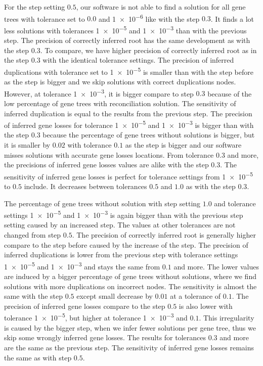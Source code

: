 For the step setting $0.5$, our software is not able to find a solution for all gene trees with tolerance set to $0.0$ and \num{1e-6} like with the step $0.3$. It finds a lot less solutions with tolerances \num{1e-5} and \num{1e-3} than with the previous step. The precision of correctly inferred root has the same development as with the step $0.3$. To compare, we have higher precision of correctly inferred root as in the step $0.3$ with the identical tolerance settings. The precision of inferred duplications with tolerance set to \num{1e-5} is smaller than with the step before as the step is bigger and we skip solutions with correct duplications nodes. However, at tolerance \num{1e-3}, it is bigger compare to step $0.3$ because of the low percentage of gene trees with reconciliation solution. The sensitivity of inferred duplication is equal to the results from the previous step. The precision of inferred gene losses for tolerance \num{1e-5} and \num{1e-3} is bigger than with the step $0.3$ because the percentage of gene trees without solutions is bigger, but it is smaller by $0.02$ with tolerance $0.1$ as the step is bigger and our software misses solutions with accurate gene losses locations. From tolerance $0.3$ and more, the precisions of inferred gene losses values are alike with the step $0.3$. The sensitivity of inferred gene losses is perfect for tolerance settings from \num{1e-5} to $0.5$ include. It decreases between tolerances $0.5$ and $1.0$ as with the step $0.3$.

The percentage of gene trees without solution with step setting $1.0$ and tolerance settings \num{1e-5} and \num{1e-3} is again bigger than with the previous step setting caused by an increased step. The values at other tolerances are not changed from step $0.5$. The precision of correctly inferred root is generally higher compare to the step before caused by the increase of the step. The precision of inferred duplications is lower from the previous step with tolerance settings \num{1e-5} and \num{1e-3} and stays the same from $0.1$ and more. The lower values are induced by a bigger percentage of gene trees without solutions, where we find solutions with more duplications on incorrect nodes. The sensitivity is almost the same with the step $0.5$ except small decrease by $0.01$ at a tolerance of $0.1$. The precision of inferred gene losses compare to the step $0.5$ is also lower with tolerance \num{1e-5}, but higher at tolerance \num{1e-3} and $0.1$. This irregularity is caused by the bigger step, when we infer fewer solutions per gene tree, thus we skip some wrongly inferred gene losses. The results for tolerances $0.3$ and more are the same as the previous step. The sensitivity of inferred gene losses remains the same as with step $0.5$.

